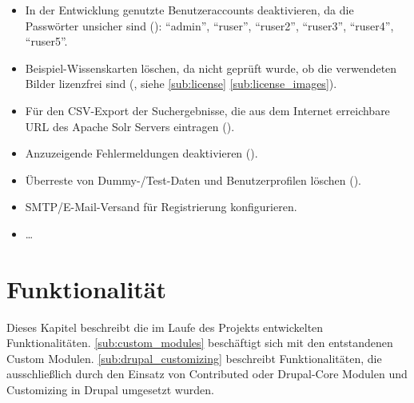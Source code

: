 \begin{itemize}
	\item In der Entwicklung genutzte Benutzeraccounts deaktivieren, da die Passwörter unsicher sind (): \enquote{admin}, \enquote{ruser}, \enquote{ruser2}, \enquote{ruser3}, \enquote{ruser4}, \enquote{ruser5}.

	\item Beispiel-Wissenskarten löschen, da nicht geprüft wurde, ob die verwendeten Bilder lizenzfrei sind (, siehe \cref*{sub:license} \cref{sub:license_images}).

	\item Für den CSV-Export der Suchergebnisse, die aus dem Internet erreichbare URL des Apache Solr Servers eintragen ().

	\item Anzuzeigende Fehlermeldungen deaktivieren ().
	
	\item Überreste von Dummy-/Test-Daten und Benutzerprofilen löschen ().

	\item SMTP/E-Mail-Versand für Registrierung konfigurieren.
	
	\item \dots {}

\end{itemize}



\newpage
\section{Funktionalität}\label{sec:function}
Dieses Kapitel beschreibt die im Laufe des Projekts entwickelten Funktionalitäten. \cref{sub:custom_modules} beschäftigt sich mit den entstandenen Custom Modulen. \cref{sub:drupal_customizing} beschreibt Funktionalitäten, die ausschließlich durch den Einsatz von Contributed oder Drupal-Core Modulen und Customizing in Drupal umgesetzt wurden.

